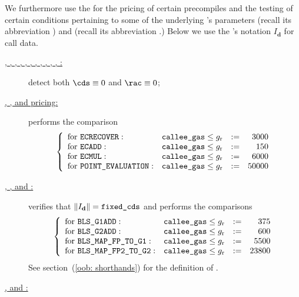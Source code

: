 We furthermore use the \oobMod{} for the pricing of certain precompiles and the testing of certain conditions pertaining to some of the underlying 's parameters
\CDS{} (recall its abbreviation \cds{}) and
\RAC{} (recall its abbreviation \rac{}.)
\saNote{} Below we use the \cite{EYP}'s notation $I_\textbf{d}$ for call data.
\begin{description}
	\item[\underline{, , , , , , , , , , , :}]
		detect both $\cds \equiv 0$ and $\rac \equiv 0$; 
	\item[\underline{, ,  and  pricing:}]
		performs the comparison
		\[
			\left\{ \begin{array}{llcrcl}
				\text{for }\texttt{ECRECOVER}       : & \texttt{callee\_gas} \leq g_\text{r} & := &  3000 \\
				\text{for }\texttt{ECADD}           : & \texttt{callee\_gas} \leq g_\text{r} & := &   150 \\
				\text{for }\texttt{ECMUL}           : & \texttt{callee\_gas} \leq g_\text{r} & := &  6000 \\
				\text{for }\texttt{POINT\_EVALUATION} : & \texttt{callee\_gas} \leq g_\text{r} & := & 50000 \\
			\end{array} \right.
		\]
	\item[\underline{, ,  and :}]
		verifies that $\| I_\textbf{d} \| = \texttt{fixed\_cds}$ and performs the comparisons
		\[
			\left\{ \begin{array}{llcrcl}
				\text{for }\texttt{BLS\_G1ADD}        	    : & \texttt{callee\_gas} \leq g_\text{r} & := &   375 \\
				\text{for }\texttt{BLS\_G2ADD}        	    : & \texttt{callee\_gas} \leq g_\text{r} & := &   600 \\
				\text{for }\texttt{BLS\_MAP\_FP\_TO\_G1} 	: & \texttt{callee\_gas} \leq g_\text{r} & := &  5500 \\
				\text{for }\texttt{BLS\_MAP\_FP2\_TO\_G2} 	: & \texttt{callee\_gas} \leq g_\text{r} & := & 23800 \\
			\end{array} \right.
		\]
		See section~(\ref{oob: shorthands}) for the definition of \locFixedCds{}.	
	\item[\underline{,  and :}]

\end{description}
